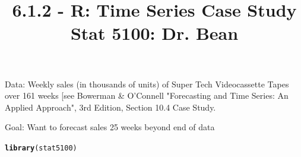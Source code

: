 \documentclass{article}\usepackage[]{graphicx}\usepackage[]{color}
\makeatletter
\newcommand{\hlstd}[1]{\textcolor[rgb]{0.345,0.345,0.345}{#1}}%
\newcommand{\hlkwd}[1]{\textcolor[rgb]{0.737,0.353,0.396}{\textbf{#1}}}%
\newenvironment{kframe}{%
 \def\at@end@of@kframe{}%
 \ifinner\ifhmode%
  \def\at@end@of@kframe{\end{minipage}}%
  \begin{minipage}{\columnwidth}%
 \fi\fi%
 \def\FrameCommand##1{\hskip\@totalleftmargin \hskip-\fboxsep
 \colorbox{shadecolor}{##1}\hskip-\fboxsep
     \hskip-\linewidth \hskip-\@totalleftmargin \hskip\columnwidth}%
 \MakeFramed {\advance\hsize-\width
   \@totalleftmargin\z@ \linewidth\hsize
   \@setminipage}}%
 {\par\unskip\endMakeFramed%
 \at@end@of@kframe}
\newenvironment{knitrout}{}{} %
\makeatother
\begin{document}
\title{%
6.1.2 - R: Time Series Case Study \\
\smallskip
\large Stat 5100: Dr. Bean
}
\date{}

\maketitle

\noindent Data: Weekly sales (in thousands of units) of Super Tech Videocassette Tapes over 161 weeks [see Bowerman \& O'Connell "Forecasting and Time Series: An Applied Approach", 3rd Edition, Section 10.4 Case Study. 

\noindent Goal: Want to forecast sales 25 weeks beyond end of data


\begin{knitrout}
\color{fgcolor}\begin{kframe}
\begin{alltt}
\hlkwd{library}\hlstd{(stat5100)}


\end{alltt}
\end{kframe}
\end{knitrout}
\end{document}
